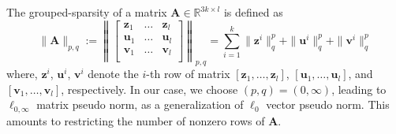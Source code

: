 \documentclass{article}
\begin{document}
The grouped-sparsity of a matrix $\mathbf{A} \in \mathbb{R}^{3k \times l}$ is defined as
$$
\|\mathbf{A} \|_{p,q} := 
\left\|
\begin{bmatrix}
\mathbf{z}_1 & \ldots & \mathbf{z}_l \\
\mathbf{u}_1 & \ldots & \mathbf{u}_l \\
\mathbf{v}_1 & \ldots & \mathbf{v}_l \\
\end{bmatrix}
\right\|_{p,q}
=
\sum_{i=1}^{k} 
\| \mathbf{z}^i \|_q^p + \| \mathbf{u}^i \|_q^p + \| \mathbf{v}^i \|_q^p
$$
where, $\mathbf{z}^i$, $\mathbf{u}^i$, $\mathbf{v}^i$ denote the $i$-th row of matrix $[\mathbf{z}_1, \ldots, \mathbf{z}_l]$, $[\mathbf{u}_1, \ldots, \mathbf{u}_l]$, and $[\mathbf{v}_1, \ldots, \mathbf{v}_l]$, respectively. In our case, we choose $(p,q) = (0,\infty)$, leading to $\ell_{0,\infty}$ matrix pseudo norm, as a generalization of $\ell_0$ vector pseudo norm. This amounts to restricting the number of nonzero rows of $\mathbf{A}$. 
\end{document}
